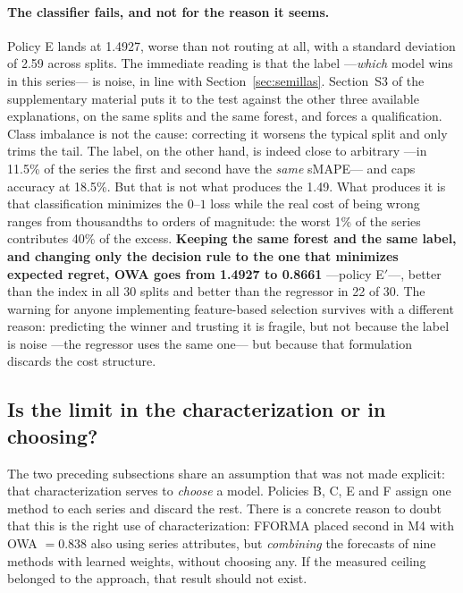 \paragraph{The classifier fails, and not for the reason it seems.} Policy E lands at
1.4927, worse than not routing at all, with a standard deviation of 2.59 across splits.
The immediate reading is that the label ---\emph{which} model wins in this series--- is
noise, in line with Section~\ref{sec:semillas}. Section~S3 of the supplementary material
puts it to the test against the other three available explanations, on the same splits and
the same forest, and forces a qualification. Class imbalance is not the cause: correcting
it worsens the typical split and only trims the tail. The label, on the other hand, is
indeed close to arbitrary ---in 11.5\% of the series the first and second have the
\emph{same} sMAPE--- and caps accuracy at 18.5\%. But that is not what produces the 1.49.
What produces it is that classification minimizes the $0$--$1$ loss while the real cost of
being wrong ranges from thousandths to orders of magnitude: the worst 1\% of the series
contributes 40\% of the excess. \textbf{Keeping the same forest and the same label, and
changing only the decision rule to the one that minimizes expected regret, OWA goes from
1.4927 to 0.8661} ---policy E$'$---, better than the index in all 30 splits and better
than the regressor in 22 of 30. The warning for anyone implementing feature-based
selection survives with a different reason: predicting the winner and trusting it is
fragile, but not because the label is noise ---the regressor uses the same one--- but
because that formulation discards the cost structure.


\subsection{Is the limit in the characterization or in choosing?}\label{sec:combinar}

The two preceding subsections share an assumption that was not made explicit: that
characterization serves to \emph{choose} a model. Policies B, C, E and F assign one method
to each series and discard the rest. There is a concrete reason to doubt that this is the
right use of characterization: FFORMA \cite{monteromanso2020} placed second in M4 with OWA
$=0.838$ also using series attributes, but \emph{combining} the forecasts of nine methods
with learned weights, without choosing any. If the measured ceiling belonged to the
approach, that result should not exist.

